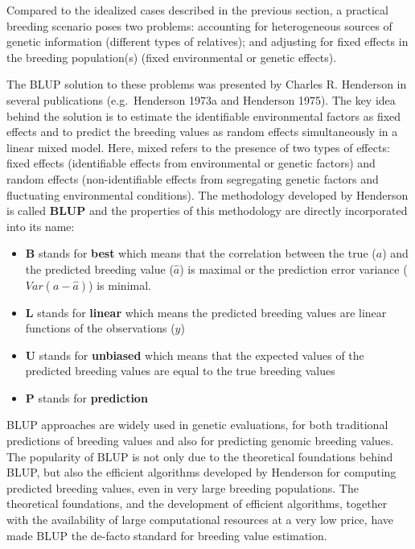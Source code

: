 \documentclass[
]{article}
\providecommand{\tightlist}{%
  \setlength{\itemsep}{0pt}\setlength{\parskip}{0pt}}
\begin{document}
Compared to the idealized cases described in the previous section, a practical breeding scenario poses two problems: accounting for heterogeneous sources of genetic information (different types of relatives); and adjusting for fixed effects in the breeding population(s) (fixed environmental or genetic effects).

The BLUP solution to these problems was presented by Charles R. Henderson in several publications (e.g.~Henderson 1973a and Henderson 1975). The key idea behind the solution is to estimate the identifiable environmental factors as fixed effects and to predict the breeding values as random effects simultaneously in a linear mixed model. Here, mixed refers to the presence of two types of effects: fixed effects (identifiable effects from environmental or genetic factors) and random effects (non-identifiable effects from segregating genetic factors and fluctuating environmental conditions). The methodology developed by Henderson is called \textbf{BLUP} and the properties of this methodology are directly incorporated into its name:

\begin{itemize}
\tightlist
\item
  \textbf{B} stands for \textbf{best} which means that the correlation between the true (\(a\)) and the predicted breeding value (\(\hat{a}\)) is maximal or the prediction error variance (\(Var(a - \hat{a})\)) is minimal.
\item
  \textbf{L} stands for \textbf{linear} which means the predicted breeding values are linear functions of the observations (\(y\))
\item
  \textbf{U} stands for \textbf{unbiased} which means that the expected values of the predicted breeding values are equal to the true breeding values
\item
  \textbf{P} stands for \textbf{prediction}
\end{itemize}

BLUP approaches are widely used in genetic evaluations, for both traditional predictions of breeding values and also for predicting genomic breeding values. The popularity of BLUP is not only due to the theoretical foundations behind BLUP, but also the efficient algorithms developed by Henderson for computing predicted breeding values, even in very large breeding populations. The theoretical foundations, and the development of efficient algorithms, together with the availability of large computational resources at a very low price, have made BLUP the de-facto standard for breeding value estimation.
\end{document}
